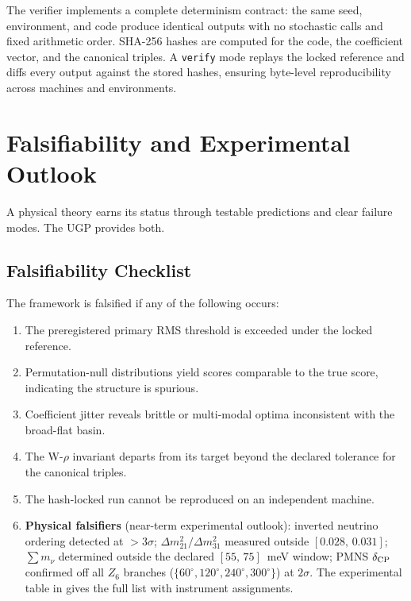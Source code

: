 \documentclass[11pt]{article}
\theoremstyle{remark}
\begin{document}
\begin{sloppypar}
The verifier implements a complete determinism contract:
the same seed, environment, and code produce identical outputs with no stochastic calls and fixed arithmetic order.
SHA-256 hashes are computed for the code, the coefficient vector, and the canonical triples.
A \texttt{verify} mode replays the locked reference and diffs every output against the stored hashes, ensuring byte-level reproducibility across machines and environments.
\end{sloppypar}


\section{Falsifiability and Experimental Outlook}
\label{sec:falsifiability}

A physical theory earns its status through testable predictions and clear failure modes.
The UGP provides both.

\subsection{Falsifiability Checklist}

The framework is falsified if any of the following occurs:
\begin{enumerate}[leftmargin=1.2em,itemsep=0.2em]
    \item The preregistered primary RMS threshold is exceeded under the locked reference.
    \item Permutation-null distributions yield scores comparable to the true score, indicating the structure is spurious.
    \item Coefficient jitter reveals brittle or multi-modal optima inconsistent with the broad-flat basin.
    \item The W-$\rho$ invariant departs from its target beyond the declared tolerance for the canonical triples.
    \item The hash-locked run cannot be reproduced on an independent machine.
    \item \textbf{Physical falsifiers} (near-term experimental outlook): inverted neutrino ordering detected at $>3\sigma$; $\Delta m^2_{21}/\Delta m^2_{31}$ measured outside $[0.028,\,0.031]$; $\sum m_\nu$ determined outside the declared $[55,\,75]$~meV window; PMNS $\delta_{\rm CP}$ confirmed off all $Z_6$ branches ($\{60^\circ, 120^\circ, 240^\circ, 300^\circ\}$) at $2\sigma$.  The experimental table in  gives the full list with instrument assignments.
\end{enumerate}
\end{document}
